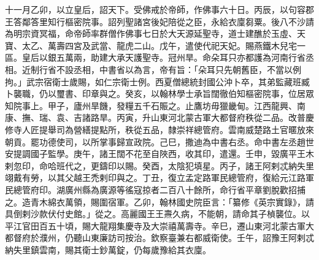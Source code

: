 \begin{pinyinscope}
 十一月乙卯，以立皇后，詔天下。受佛戒於帝師，作佛事六十日。丙辰，以句容郡王答鄰答里知行樞密院事。詔列聖諸宮後妃陪從之臣，永給衣廩芻粟。後八不沙請為明宗資冥福，命帝師率群僧作佛事七日於大天源延聖寺，道士建醮於玉虛、天寶、太乙、萬壽四宮及武當、龍虎二山。戊午，遣使代祀天妃。賜燕鐵木兒宅一區。皇后以銀五萬兩，助建大承天護聖寺。冠州旱。命朵耳只亦都護為河南行省丞相。近制行省不設丞相，中書省以為言，帝有旨：「朵耳只先朝舊臣，不當以例拘。」武宗宿衛士歲賜，如仁宗衛士例。西夏僧總統封國公沖卜卒，其弟監藏班臧卜襲職，仍以璽書、印章與之。癸亥，以翰林學士承旨闊徹伯知樞密院事，位居眾知院事上。甲子，廬州旱饑，發糧五千石賑之。止鷹坊毋獵畿甸。江西龍興、南康、撫、瑞、袁、吉諸路旱。丙寅，升山東河北蒙古軍大都督府秩從二品。改普慶修寺人匠提舉司為營繕提點所，秩從五品，隸崇祥總管府。雲南威楚路土官暱放來朝貢。罷功德使司，以所掌事歸宣政院。己巳，撒迪為中書右丞。命中書左丞趙世安提調國子監學。庚午，諸王闊不花至自陜西，收其印，遣還。壬申，毀廣平王木剌忽印，命哈班代之，更鑄印以賜。癸酉，太陰犯填星。丙子，諸王阿剌忒納失里翊戴有勞，以其父越王禿剌印與之。丁丑，復立孟定路軍民總管府，復給元江路軍民總管府印。湖廣州縣為廣源等徭寇掠者二百八十餘所，命行省平章劉脫歡招捕之。造青木綿衣萬領，賜圍宿軍。乙卯，翰林國史院臣言：「纂修《英宗實錄》，請具倒剌沙款伏付史館。」從之。高麗國王王燾久病，不能朝，請命其子楨襲位。以平江官田百五十頃，賜大龍翔集慶寺及大崇禧萬壽寺。辛巳，遷山東河北蒙古軍大都督府於濮州，仍聽山東廉訪司按治。欽察臺兼右都威衛使。壬午，詔豫王阿剌忒納失里鎮雲南，賜其衛士鈔萬錠，仍每歲豫給其衣廩。




\end{pinyinscope}
